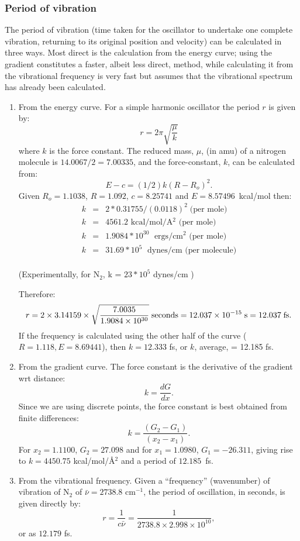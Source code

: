 \subsubsection{Period of vibration}
The period of vibration (time taken for the oscillator to undertake one
complete vibration, returning to its original position and velocity) can be
calculated in three ways.  Most direct is  the  calculation  from the  energy
curve; using the gradient constitutes a faster, albeit less direct, method,
while calculating it from the vibrational  frequency  is very  fast  but
assumes  that the vibrational spectrum has already been calculated.

\begin{enumerate}

\item From the energy curve. For a simple harmonic oscillator the period $r$ is
given by: $$ r = 2 \pi \sqrt{\frac{\mu}{k}}  $$ where $k$ is the
force constant.   The
reduced  mass, $\mu$,  (in amu)   of   a   nitrogen  molecule  is
$14.0067/2  =  7.00335$, and  the force-constant, $k$, can be
calculated from: $$E-c = (1/2) k(R-R_o)^2. $$ Given $R_o =
1.1038$, $R = 1.092$, $c = 8.25741$ and $E = 8.57496$~kcal/mol
then:
 \begin{eqnarray*}
k &=& 2*0.31755/(0.0118)^2 \; \mbox{(per mole)}\\
k &=& 4561.2 \mbox{ kcal/mol/A$^2$  (per mole)}\\
k &=& 1.9084*10^{30} \; \mbox{ ergs/cm$^2$ (per mole)}\\
k &=& 31.69*10^5  \; \mbox{ dynes/cm (per molecule)}\\
\end{eqnarray*}

(Experimentally, for N$_2$, k = $23*10^5$ dynes/cm )

Therefore:
$$ r = 2 \times 3.14159 \times \sqrt{\frac{7.0035}{1.9084\times 10^{30}}}
\;{\rm seconds} = 12.037 \times 10^{-15}\;{\rm s} = 12.037\;{\rm fs}. $$
If the frequency is calculated using the other half of the curve ($R=1.118,
E=8.69441$), then $k=12.333$ fs, or $k$, average, = 12.185 fs.

\item From the gradient curve. The force  constant  is  the  derivative  of
the  gradient  wrt distance:
$$ k = \frac{dG}{dx}. $$
Since we are using discrete points,  the  force  constant  is  best
obtained from finite differences:
$$ k = \frac{(G_2-G_1)}{(x_2-x_1)}. $$
For $x_2 = 1.1100$, $G_2 = 27.098$ and for $x_1 =  1.0980$,
$G_1  =  -26.311$,
giving rise to $k = 4450.75$ kcal/mol/\AA$^2$ and a period of $12.185$~fs.

\item From the vibrational frequency. Given a ``frequency'' (wavenumber) of
vibration of N$_2$ of $\bar{\nu}=2738.8$   cm$^{-1}$,  the period of
oscillation, in seconds, is given directly by:
$$ r = \frac{1}{c\bar{\nu}} = \frac{1}{2738.8 \times 2.998 \times 10^{10}} ,$$
or as $12.179$ fs.
\end{enumerate}

